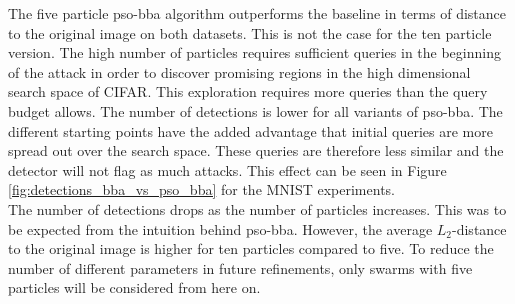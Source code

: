 The five particle \gls{pso}-\gls{bba} algorithm outperforms the baseline in terms of distance to the original image on both datasets. This is not the case for the ten particle version. The high number of particles requires sufficient queries in the beginning of the attack in order to discover promising regions in the high dimensional search space of CIFAR. This exploration requires more queries than the query budget allows. The number of detections is lower for all variants of \gls{pso}-\gls{bba}. The different starting points have the added advantage that initial queries are more spread out over the search space. These queries are therefore less similar and the detector will not flag as much attacks. This effect can be seen in Figure \ref{fig:detections_bba_vs_pso_bba} for the MNIST experiments.\\

The number of detections drops as the number of particles increases. This was to be expected from the intuition behind \gls{pso}-\gls{bba}. However, the average $L_2$-distance to the original image is higher for ten particles compared to five. To reduce the number of different parameters in future refinements, only swarms with five particles will be considered from here on.\\ 

